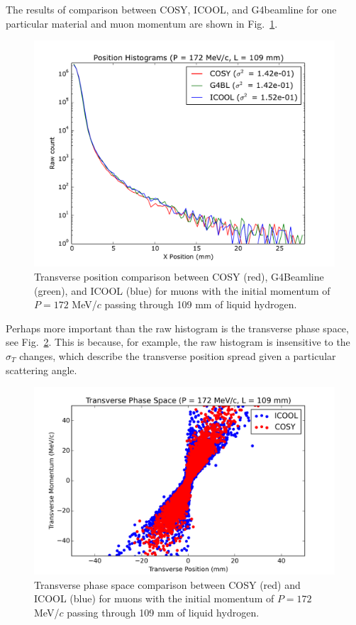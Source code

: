 \documentclass{jacow}
\begin{document}
The results of comparison between COSY, ICOOL, and G4beamline for one particular material and muon momentum are shown in Fig.~\ref{fig:transverse}.

\begin{figure}[htbf]
\centering
\includegraphics[width=\columnwidth]{Figures/transverse.pdf}
\caption{Transverse position comparison between COSY (red), G4Beamline (green), and ICOOL (blue) for muons with the initial momentum of $P=172$ MeV/$c$ passing through 109 mm of liquid hydrogen.}
\label{fig:transverse}
\end{figure}

Perhaps more important than the raw histogram is the transverse phase space, see Fig.~\ref{fig:transverse_phase_space}. This is because, for example, the raw histogram is insensitive to the $\sigma_T$ changes, which describe the transverse position spread given a particular scattering angle.

\begin{figure}[htbf]
\centering
\includegraphics[width=\columnwidth]{Figures/transverse_phase_space}
\caption{Transverse phase space comparison between COSY (red) and ICOOL (blue) for muons with the initial momentum of $P=172$ MeV/$c$ passing through 109 mm of liquid hydrogen.}
\label{fig:transverse_phase_space}
\end{figure}
\end{document}
